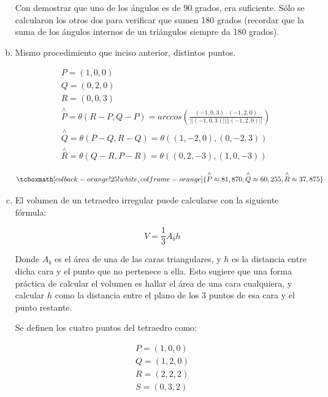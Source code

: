 \documentclass{article}
\begin{document}
\begin{enumerate}[(a)]
Con demostrar que uno de los ángulos es de 90 grados, era suficiente. Sólo se calcularon los otros dos para verificar que sumen 180 grados (recordar que la suma de los ángulos internos de un triángulos siempre da 180 grados).

\item Mismo procedimiento que inciso anterior, distintos puntos.

\begin{subequations}
\begin{align}
& P = (1, 0, 0) \\
& Q = (0, 2, 0) \\
& R = (0, 0, 3) \\
& \overset{\wedge}{P} = \theta(R-P, Q-P) = arccos \left(\frac{(-1,0,3) \cdot (-1, 2, 0)}{||(-1, 0, 3)|| ||(-1,2,0)||} \right) \\
& \overset{\wedge}{Q} = \theta(P-Q, R-Q) = \theta((1,-2,0),(0, -2, 3)) \\
& \overset{\wedge}{R} = \theta(Q-R, P-R) = \theta((0,2,-3),(1, 0, -3))
\end{align}
\end{subequations}

\begin{equation}
\tcboxmath[colback=orange!25!white,colframe=orange]
{ \overset{\wedge}{P} \approx 81,870, \overset{\wedge}{Q} \approx 60,255, \overset{\wedge}{R} \approx 37,875 }
\end{equation}

\item El volumen de un tetraedro irregular puede calcularse con la siguiente fórmula:

\begin{equation}
V = \frac{1}{3} A_b h \label{eq:voltetr}
\end{equation}

Donde $A_b$ es el área de una de las caras triangulares, y $h$ es la distancia entre dicha cara y el punto que no pertenece a ella. Esto sugiere que una forma práctica de calcular el volumen es hallar el área de una cara cualquiera, y calcular $h$ como la distancia entre el plano de los 3 puntos de esa cara y el punto restante.

Se definen los cuatro puntos del tetraedro como:

\begin{align}
P = (1, 0, 0) \\
Q = (1, 2, 0) \\
R = (2, 2, 2) \\
S = (0, 3, 2)
\end{align}


\end{enumerate}
\end{document}
